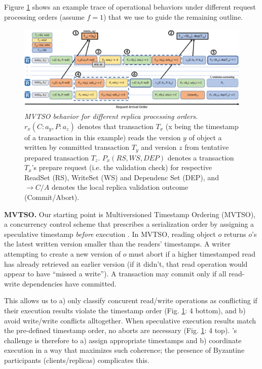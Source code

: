  
Figure \ref{fig:MVTSOEX} shows an example trace of \sys operational behaviors under different request processing orders (assume $f=1$) that we use to guide the remaining outline.

\begin{figure}
\begin{center}
\includegraphics[width= \textwidth]{./figures/MVTSOLargeFont.png}
\end{center}
\caption{\emph{MVTSO behavior for different replica processing orders}. $r_x(C : a_y ,P : a_z)$ denotes that transaction $T_x$ (x being the timestamp of a transaction in this example) reads the version $y$ of object a written by committed transaction $T_y$ and version $z$ from tentative prepared transaction $T_z$. $P_x(RS,WS,DEP)$ denotes a transaction $T_x$'s prepare request (i.e. the validation check) for respective ReadSet (RS), WriteSet (WS) and Dependenc Set (DEP), and $\rightarrow C / A$ denotes the local replica validation outcome (Commit/Abort).} 
\label{fig:MVTSOEX}
\end{figure}

\par \textbf{MVTSO.} Our starting point is Multiversioned Timestamp Ordering (MVTSO), a concurrency control scheme that prescribes a serialization order by assigning a speculative timestamp \textit{before} execution \cite{bernstein1983multiversion, reed1983implementing, su2017tebaldi}. In MVTSO, reading object $o$  returns $o$'s  the latest written version smaller than the readers' timestamps. A writer attempting to create a new version of $o$  must abort if a higher timestamped read has already retrieved an earlier version (if it didn't, that read operation would appear to have ``missed a write''). A transaction may commit only if all read-write dependencies have committed.

\iffalse
{}  This allows us to a) only classify concurent read/write operations as conflicting if their execution results violate the timestamp order (Fig. \ref{fig:MVTSOEX}: 4 bottom), and b) avoid write/write conflicts alltogether. 
When speculative execution results match the pre-defined timestamp order, no aborts are necessary (Fig. \ref{fig:MVTSOEX}: 4 top). \sys{}'s challenge is therefore to a) assign appropriate timestamps and b) coordinate execution in a way that maximizes such coherence; the presence of Byzantine participants (clients/replicas) complicates this.


